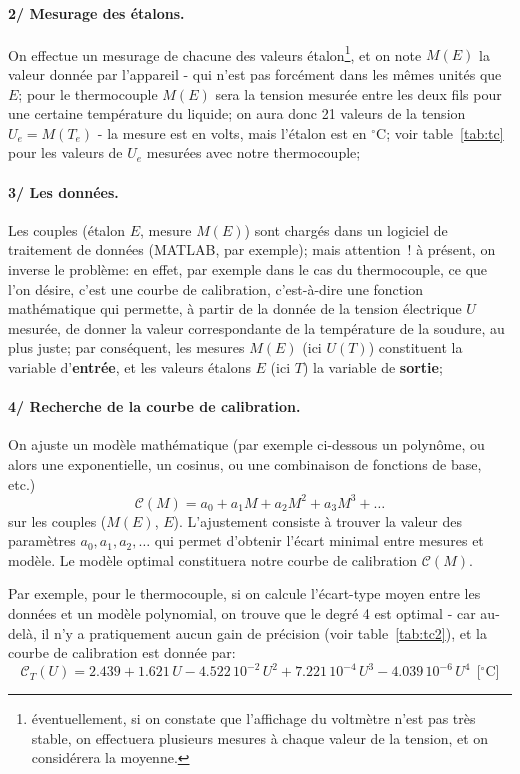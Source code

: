 \paragraph{2/ Mesurage des étalons.} On effectue un mesurage de chacune des valeurs étalon\footnote{éventuellement, si on constate que l'affichage du voltmètre n'est pas très stable, on effectuera plusieurs mesures à chaque valeur de la tension, et on considérera la moyenne.}, et on note $M(E)$ la valeur donnée par l'appareil - qui n'est pas forcément dans les mêmes unités que $E$; pour le thermocouple $M(E)$ sera la tension mesurée entre les deux fils pour une certaine température du liquide; on aura donc 21 valeurs de la tension $U_e=M(T_e)$ - la mesure est en volts, mais l'étalon est en $^\circ$C; voir table~\ref{tab:tc} pour les valeurs de $U_e$ mesurées avec notre thermocouple;

\paragraph{3/ Les données.} Les couples (étalon $E$, mesure $M(E)$) sont chargés dans un logiciel de traitement de données (MATLAB, par exemple); mais attention~! à présent, on inverse le problème: en effet, par exemple dans le cas du thermocouple, ce que l'on désire, c'est une courbe de calibration, c'est-à-dire une fonction mathématique qui permette, à partir de la donnée de la tension électrique $U$ mesurée, de donner la valeur correspondante de la température de la soudure, au plus juste; par conséquent, les mesures $M(E)$ (ici $U(T)$) constituent la variable d'\textbf{entrée}, et les valeurs étalons $E$ (ici $T$) la variable de \textbf{sortie};

\paragraph{4/ Recherche de la courbe de calibration.} On ajuste un modèle mathématique (par exemple ci-dessous un polynôme, ou alors une exponentielle, un cosinus, ou une combinaison de fonctions de base, etc.) $$\mathcal{C}(M)=a_0+a_1M+a_2M^2+a_3M^3+\dots$$ sur les couples ($M(E)$, $E$). L'ajustement consiste à trouver la valeur des paramètres $a_0, a_1, a_2,\dots$ qui permet d'obtenir l'écart minimal entre mesures et modèle. Le modèle optimal constituera notre courbe de calibration $\mathcal{C}(M)$.

Par exemple, pour le thermocouple, si on calcule l'écart-type moyen entre les données et un modèle polynomial, on trouve que le degré 4 est optimal - car au-delà, il n'y a pratiquement aucun gain de précision (voir table~\ref{tab:tc2}), et la courbe de calibration est donnée par:
\begin{equation*}
\mathcal{C}_T(U)=2.439+1.621\,U-4.522\,10^{-2}\,U^2+7.221\,10^{-4}\,U^3-4.039\,10^{-6}\,U^4\ \ \text{[$^\circ$C]}
\end{equation*}

